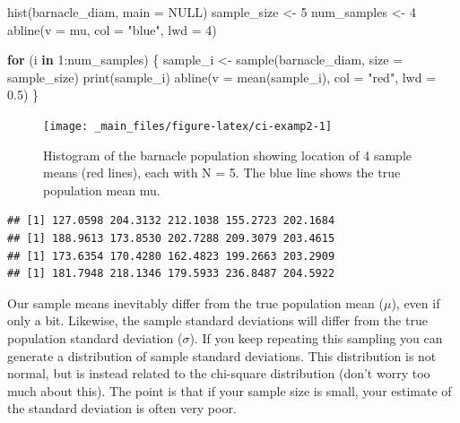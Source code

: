 \documentclass[
  11pt,
  a4paper,
]{book}
\newenvironment{Shaded}{\begin{snugshade}}{\end{snugshade}}
\newcommand{\AttributeTok}[1]{\textcolor[rgb]{0.77,0.63,0.00}{#1}}
\newcommand{\ConstantTok}[1]{\textcolor[rgb]{0.00,0.00,0.00}{#1}}
\newcommand{\ControlFlowTok}[1]{\textcolor[rgb]{0.13,0.29,0.53}{\textbf{#1}}}
\newcommand{\DecValTok}[1]{\textcolor[rgb]{0.00,0.00,0.81}{#1}}
\newcommand{\FloatTok}[1]{\textcolor[rgb]{0.00,0.00,0.81}{#1}}
\newcommand{\FunctionTok}[1]{\textcolor[rgb]{0.00,0.00,0.00}{#1}}
\newcommand{\NormalTok}[1]{#1}
\newcommand{\OtherTok}[1]{\textcolor[rgb]{0.56,0.35,0.01}{#1}}
\newcommand{\SpecialCharTok}[1]{\textcolor[rgb]{0.00,0.00,0.00}{#1}}
\newcommand{\StringTok}[1]{\textcolor[rgb]{0.31,0.60,0.02}{#1}}
\begin{document}
\begin{Shaded}
\begin{Highlighting}[]
\FunctionTok{hist}\NormalTok{(barnacle\_diam, }\AttributeTok{main =} \ConstantTok{NULL}\NormalTok{)}
\NormalTok{sample\_size }\OtherTok{\textless{}{-}} \DecValTok{5}
\NormalTok{num\_samples }\OtherTok{\textless{}{-}} \DecValTok{4}
\FunctionTok{abline}\NormalTok{(}\AttributeTok{v =}\NormalTok{ mu, }\AttributeTok{col =} \StringTok{"blue"}\NormalTok{, }\AttributeTok{lwd =} \DecValTok{4}\NormalTok{)}

\ControlFlowTok{for}\NormalTok{ (i }\ControlFlowTok{in} \DecValTok{1}\SpecialCharTok{:}\NormalTok{num\_samples) \{}
\NormalTok{  sample\_i }\OtherTok{\textless{}{-}} \FunctionTok{sample}\NormalTok{(barnacle\_diam, }\AttributeTok{size =}\NormalTok{ sample\_size)}
  \FunctionTok{print}\NormalTok{(sample\_i)}
  \FunctionTok{abline}\NormalTok{(}\AttributeTok{v =} \FunctionTok{mean}\NormalTok{(sample\_i), }\AttributeTok{col =} \StringTok{"red"}\NormalTok{, }\AttributeTok{lwd =} \FloatTok{0.5}\NormalTok{)}
\NormalTok{\}}
\end{Highlighting}
\end{Shaded}

\begin{figure}

{\centering \texttt{[image: \_main\_files/figure-latex/ci-examp2-1]} 

}

\caption{Histogram of the barnacle population showing location of 4 sample means (red lines), each with N = 5. The blue line shows the true population mean mu.}\label{fig:ci-examp2}
\end{figure}

\begin{verbatim}
## [1] 127.0598 204.3132 212.1038 155.2723 202.1684
## [1] 188.9613 173.8530 202.7288 209.3079 203.4615
## [1] 173.6354 170.4280 162.4823 199.2663 203.2909
## [1] 181.7948 218.1346 179.5933 236.8487 204.5922
\end{verbatim}

Our sample means inevitably differ from the true population mean (\(\mu\)), even if only a bit. Likewise, the sample standard deviations will differ from the true population standard deviation (\(\sigma\)). If you keep repeating this sampling you can generate a distribution of sample standard deviations. This distribution is not normal, but is instead related to the chi-square distribution (don't worry too much about this). The point is that if your sample size is small, your estimate of the standard deviation is often very poor.
\end{document}
